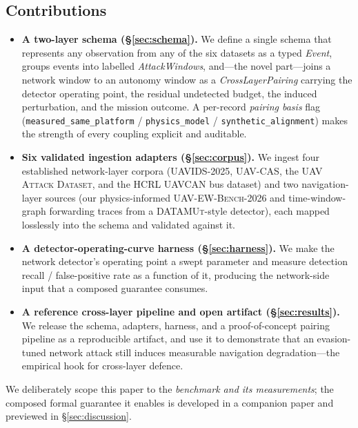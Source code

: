 \documentclass[conference]{IEEEtran}
\newcommand{\dataset}[1]{\textsc{#1}}
\newcommand{\code}[1]{\texttt{#1}}
\begin{document}
\subsection*{Contributions}
\begin{itemize}
\item \textbf{A two-layer schema (\S\ref{sec:schema}).} We define a single schema
that represents any observation from any of the six datasets as a typed
\emph{Event}, groups events into labelled \emph{AttackWindows}, and---the novel
part---joins a network window to an autonomy window as a
\emph{CrossLayerPairing} carrying the detector operating point, the residual
undetected budget, the induced perturbation, and the mission outcome. A
per-record \emph{pairing basis} flag (\code{measured\_same\_platform} /
\code{physics\_model} / \code{synthetic\_alignment}) makes the strength of every
coupling explicit and auditable.

\item \textbf{Six validated ingestion adapters (\S\ref{sec:corpus}).} We ingest
four established network-layer corpora (\dataset{UAVIDS-2025},
\dataset{UAV-CAS}, the \dataset{UAV Attack Dataset}, and the \dataset{HCRL
UAVCAN} bus dataset) and two navigation-layer sources (our physics-informed
\dataset{UAV-EW-Bench-2026} and time-window-graph forwarding traces from a
\dataset{DATAMUt}-style detector), each mapped losslessly into the schema and
validated against it.

\item \textbf{A detector-operating-curve harness (\S\ref{sec:harness}).} We make
the network detector's operating point a swept parameter and measure
detection recall / false-positive rate as a function of it, producing the
network-side input that a composed guarantee consumes.

\item \textbf{A reference cross-layer pipeline and open artifact
(\S\ref{sec:results}).} We release the schema, adapters, harness, and a
proof-of-concept pairing pipeline as a reproducible artifact, and use it to
demonstrate that an evasion-tuned network attack still induces measurable
navigation degradation---the empirical hook for cross-layer defence.
\end{itemize}

We deliberately scope this paper to the \emph{benchmark and its measurements};
the composed formal guarantee it enables is developed in a companion paper and
previewed in \S\ref{sec:discussion}.

\end{document}
